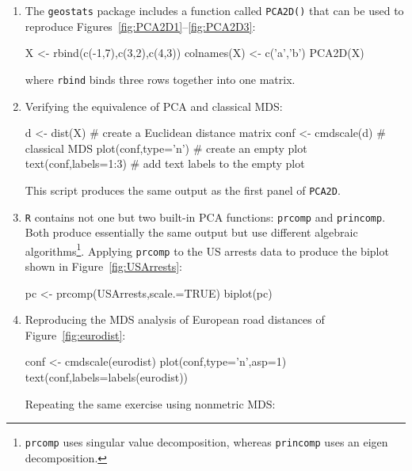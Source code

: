 \begin{enumerate}

\item The \texttt{geostats} package includes a function called
  \texttt{PCA2D()} that can be used to reproduce
  Figures~\ref{fig:PCA2D1}--\ref{fig:PCA2D3}:

\begin{script}
X <- rbind(c(-1,7),c(3,2),c(4,3))
colnames(X) <- c('a','b')
PCA2D(X)
\end{script}

\noindent where \texttt{rbind} binds three rows together into one
matrix.

\item Verifying the equivalence of PCA and classical MDS:

\begin{script}[firstnumber=3]
d <- dist(X)           # create a Euclidean distance matrix
conf <- cmdscale(d)    # classical MDS
plot(conf,type='n')    # create an empty plot
text(conf,labels=1:3)  # add text labels to the empty plot
\end{script}

This script produces the same output as the first panel of
\texttt{PCA2D}.

\item \texttt{R} contains not one but two built-in PCA functions:
  \texttt{prcomp} and \texttt{princomp}. Both produce essentially the
  same output but use different algebraic
  algorithms\footnote{\texttt{prcomp} uses singular value
  decomposition, whereas \texttt{princomp} uses an eigen
  decomposition.}. Applying \texttt{prcomp} to the US arrests data to
  produce the biplot shown in Figure~\ref{fig:USArrests}:

\begin{script}
pc <- prcomp(USArrests,scale.=TRUE)
biplot(pc)
\end{script}

\item Reproducing the MDS analysis of European road distances of
  Figure~\ref{fig:eurodist}:

\begin{script}
conf <- cmdscale(eurodist)
plot(conf,type='n',asp=1)
text(conf,labels=labels(eurodist))
\end{script}

Repeating the same exercise using nonmetric MDS:



\end{enumerate}
